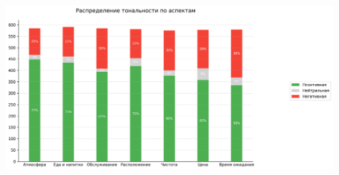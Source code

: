 \documentclass[a4paper,12pt]{extarticle}
\begin{document}
\vspace{1em}
\begin{center}
    \includegraphics[width=0.95\textwidth]{images/49543885926/histogram.png}
\end{center}
\vspace{1em}
\end{document}
